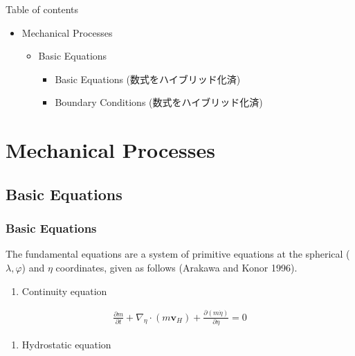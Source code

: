 Table of contents

\begin{itemize}
\tightlist
\item
  Mechanical Processes

  \begin{itemize}
  \tightlist
  \item
    Basic Equations

    \begin{itemize}
    \tightlist
    \item
      Basic Equations (数式をハイブリッド化済)
    \item
      Boundary Conditions (数式をハイブリッド化済)
    \end{itemize}
  \end{itemize}
\end{itemize}

\hypertarget{mechanical-processes}{%
\section{Mechanical Processes}\label{mechanical-processes}}

\hypertarget{basic-equations}{%
\subsection{Basic Equations}\label{basic-equations}}

\hypertarget{basic-equations-1}{%
\subsubsection{Basic Equations}\label{basic-equations-1}}

The fundamental equations are a system of primitive equations at the
spherical (\(\lambda,\varphi\)) and \(\eta\) coordinates, given as
follows (Arakawa and Konor 1996).

\begin{enumerate}
\def\labelenumi{\arabic{enumi}.}
\tightlist
\item
  Continuity equation
\end{enumerate}

\begin{eqnarray}
  \frac{\partial m}{\partial t}
    + \nabla_{\eta} \cdot (m\mathbf{v}_H)+ \frac{\partial (m\dot{\eta})}{\partial \eta} = 0
\end{eqnarray}

\begin{enumerate}
\def\labelenumi{\arabic{enumi}.}
\setcounter{enumi}{1}
\tightlist
\item
  Hydrostatic equation
\end{enumerate}

